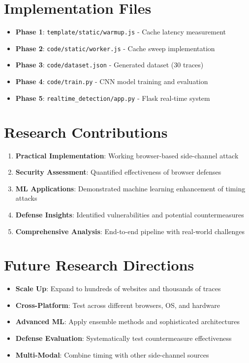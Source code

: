 \documentclass[11pt,a4paper]{article}
\begin{document}
\section{Implementation Files}

\begin{itemize}[leftmargin=*]
    \item \textbf{Phase 1}: \texttt{template/static/warmup.js} - Cache latency measurement
    \item \textbf{Phase 2}: \texttt{code/static/worker.js} - Cache sweep implementation
    \item \textbf{Phase 3}: \texttt{code/dataset.json} - Generated dataset (30 traces)
    \item \textbf{Phase 4}: \texttt{code/train.py} - CNN model training and evaluation
    \item \textbf{Phase 5}: \texttt{realtime\_detection/app.py} - Flask real-time system
\end{itemize}

\section{Research Contributions}

\begin{enumerate}[leftmargin=*]
    \item \textbf{Practical Implementation}: Working browser-based side-channel attack
    \item \textbf{Security Assessment}: Quantified effectiveness of browser defenses
    \item \textbf{ML Applications}: Demonstrated machine learning enhancement of timing attacks
    \item \textbf{Defense Insights}: Identified vulnerabilities and potential countermeasures
    \item \textbf{Comprehensive Analysis}: End-to-end pipeline with real-world challenges
\end{enumerate}

\section{Future Research Directions}

\begin{itemize}[leftmargin=*]
    \item \textbf{Scale Up}: Expand to hundreds of websites and thousands of traces
    \item \textbf{Cross-Platform}: Test across different browsers, OS, and hardware
    \item \textbf{Advanced ML}: Apply ensemble methods and sophisticated architectures
    \item \textbf{Defense Evaluation}: Systematically test countermeasure effectiveness
    \item \textbf{Multi-Modal}: Combine timing with other side-channel sources
\end{itemize}
\end{document}
